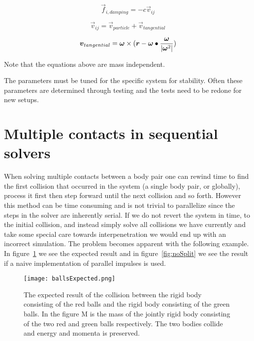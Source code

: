 \begin{equation}
  \vec{f}_{i,damping} = -c\vec{v}_{ij}
\end{equation}

\begin{equation}
  \vec{v}_{ij} = \vec{v}_{particle} + \vec{v}_{tangential}
\end{equation}

\begin{equation}\label{eq:tangent}
  \boldsymbol{v}_{tangential} = \boldsymbol{\omega} \times ( \boldsymbol{r}- \boldsymbol{\omega}\bullet\frac{\boldsymbol{\omega}}{|\boldsymbol{\omega}^2|})
\end{equation}

Note that the equations above are mass independent.

The parameters must be tuned for the
specific system for stability. Often these parameters are determined through testing
and the tests need to be redone for new setups.

\section{Multiple contacts in sequential solvers}
When solving multiple contacts between a body pair one can rewind time to
find the first collision
that occurred in the system (a single body pair, or globally), process it first
then step forward until the next collision and so forth. However this method can
be time consuming and is not trivial to parallelize since the steps in the solver are inherently serial.
If we do not revert the system in time, to the initial collision, and
instead simply solve all collisions we have currently and take some special care
towards interpenetration we would end up with an incorrect simulation. The problem
becomes apparent with the following example.
In figure~\ref{fig:ballsExpected} we see the expected result and in
figure~\ref{fig:noSplit} we see the result if a naive implementation of
parallel impulses is used.

\begin{figure}[H]
  \centering
  \texttt{[image: ballsExpected.png]}
  \caption{The expected result of the collision between the rigid body consisting
  of the red balls and the rigid body consisting of the green balls.
  In the figure M is the mass of the jointly rigid body consisting of
  the two red and green balls respectively. The two bodies collide and energy and momenta is preserved.}
  \label{fig:ballsExpected}
\end{figure}

